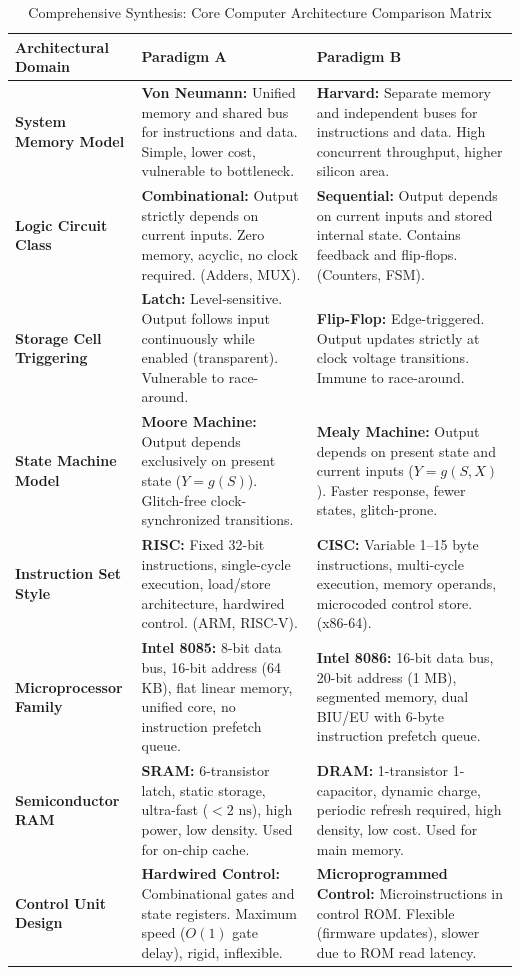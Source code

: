 \begin{table}[htbp]
\centering
\small
\caption{Comprehensive Synthesis: Core Computer Architecture Comparison Matrix}
\label{tab:master_architecture_matrix}
\begin{tabularx}{\textwidth}{l X X}
\toprule
\textbf{Architectural Domain} & \textbf{Paradigm A} & \textbf{Paradigm B} \\
\midrule
\textbf{System Memory Model} & \textbf{Von Neumann:} Unified memory and shared bus for instructions and data. Simple, lower cost, vulnerable to bottleneck. & \textbf{Harvard:} Separate memory and independent buses for instructions and data. High concurrent throughput, higher silicon area. \\
\midrule
\textbf{Logic Circuit Class} & \textbf{Combinational:} Output strictly depends on current inputs. Zero memory, acyclic, no clock required. (Adders, MUX). & \textbf{Sequential:} Output depends on current inputs and stored internal state. Contains feedback and flip-flops. (Counters, FSM). \\
\midrule
\textbf{Storage Cell Triggering} & \textbf{Latch:} Level-sensitive. Output follows input continuously while enabled (transparent). Vulnerable to race-around. & \textbf{Flip-Flop:} Edge-triggered. Output updates strictly at clock voltage transitions. Immune to race-around. \\
\midrule
\textbf{State Machine Model} & \textbf{Moore Machine:} Output depends exclusively on present state ($Y=g(S)$). Glitch-free clock-synchronized transitions. & \textbf{Mealy Machine:} Output depends on present state and current inputs ($Y=g(S,X)$). Faster response, fewer states, glitch-prone. \\
\midrule
\textbf{Instruction Set Style} & \textbf{RISC:} Fixed 32-bit instructions, single-cycle execution, load/store architecture, hardwired control. (ARM, RISC-V). & \textbf{CISC:} Variable 1--15 byte instructions, multi-cycle execution, memory operands, microcoded control store. (x86-64). \\
\midrule
\textbf{Microprocessor Family} & \textbf{Intel 8085:} 8-bit data bus, 16-bit address (64 KB), flat linear memory, unified core, no instruction prefetch queue. & \textbf{Intel 8086:} 16-bit data bus, 20-bit address (1 MB), segmented memory, dual BIU/EU with 6-byte instruction prefetch queue. \\
\midrule
\textbf{Semiconductor RAM} & \textbf{SRAM:} 6-transistor latch, static storage, ultra-fast ($<2\text{ ns}$), high power, low density. Used for on-chip cache. & \textbf{DRAM:} 1-transistor 1-capacitor, dynamic charge, periodic refresh required, high density, low cost. Used for main memory. \\
\midrule
\textbf{Control Unit Design} & \textbf{Hardwired Control:} Combinational gates and state registers. Maximum speed ($O(1)$ gate delay), rigid, inflexible. & \textbf{Microprogrammed Control:} Microinstructions in control ROM. Flexible (firmware updates), slower due to ROM read latency. \\
\bottomrule
\end{tabularx}
\end{table}


